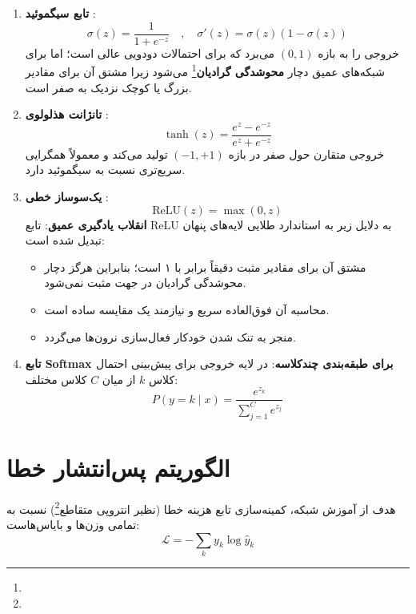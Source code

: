 \begin{enumerate}
    \item \textbf{تابع سیگموئید }:
    \begin{equation}
    \sigma(z) = \frac{1}{1 + e^{-z}} \quad , \quad \sigma'(z) = \sigma(z)(1 - \sigma(z))
    \end{equation}
    خروجی را به بازه $(0, 1)$ می‌برد که برای احتمالات دودویی عالی است؛ اما برای شبکه‌های عمیق دچار \textbf{محوشدگی گرادیان}\footnote{} می‌شود زیرا مشتق آن برای مقادیر بزرگ یا کوچک نزدیک به صفر است.
    
    \item \textbf{تانژانت هذلولوی }:
    \begin{equation}
    \tanh(z) = \frac{e^z - e^{-z}}{e^z + e^{-z}}
    \end{equation}
    خروجی متقارن حول صفر در بازه $(-1, +1)$ تولید می‌کند و معمولاً همگرایی سریع‌تری نسبت به سیگموئید دارد.
    
    \item \textbf{یک‌سوساز خطی }:
    \begin{equation}
    \text{ReLU}(z) = \max(0, z)
    \end{equation}
    \textbf{انقلاب یادگیری عمیق}: تابع ReLU به دلایل زیر به استاندارد طلایی لایه‌های پنهان تبدیل شده است:
    \begin{itemize}
        \item مشتق آن برای مقادیر مثبت دقیقاً برابر با ۱ است؛ بنابراین هرگز دچار محوشدگی گرادیان در جهت مثبت نمی‌شود.
        \item محاسبه آن فوق‌العاده سریع و نیازمند یک مقایسه ساده است.
        \item منجر به تنک شدن خودکار فعال‌سازی نرون‌ها  می‌گردد.
    \end{itemize}
    
    \item \textbf{تابع Softmax برای طبقه‌بندی چندکلاسه}:
    در لایه خروجی برای پیش‌بینی احتمال کلاس $k$ از میان $C$ کلاس مختلف:
    \begin{equation}
    P(y = k \mid x) = \frac{e^{z_k}}{\sum_{j=1}^C e^{z_j}}
    \end{equation}
\end{enumerate}

\section{الگوریتم پس‌انتشار خطا \texorpdfstring{}{(Backpropagation)}}
هدف از آموزش شبکه، کمینه‌سازی تابع هزینه خطا (نظیر انتروپی متقاطع\footnote{}) نسبت به تمامی وزن‌ها و بایاس‌هاست:
\begin{equation}
\mathcal{L} = -\sum_{k} y_k \log \hat{y}_k
\end{equation}


